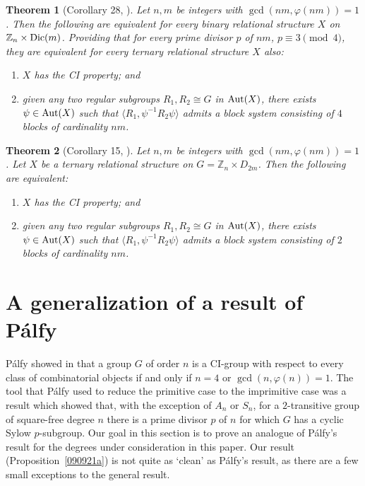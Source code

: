 \documentclass[11pt]{amsart}
\numberwithin{equation}{section}
\newtheorem{thrm}{Theorem}[section]
\theoremstyle{definition}
\newcounter{case}
\def\Aut{{\rm Aut}}
\def\Z{{\mathbb Z}}
\newcommand{\sg}[1]{\langle{#1}\rangle}
\begin{document}
	\begin{thrm}[Corollary 28, \cite{Dobson2003}]\label{dicyclic-conditional}
		Let $n,m$ be integers with $\gcd(nm,\varphi(nm))=1$. Then the following are equivalent for every binary relational structure $X$ on $\Z_n \times {\rm Dic}(m)$. Providing that for every prime divisor $p$ of $nm$, $p \equiv 3 \pmod{4}$, they are equivalent for every ternary relational structure $X$ also: 
		\begin{enumerate}
			\item $X$ has the CI property; and
			\item given any two regular subgroups $R_1, R_2 \cong G$ in $\Aut(X)$, there exists $\psi \in \Aut(X)$ such that $\sg{R_1, \psi^{-1}R_2\psi}$ admits a  block system consisting of $4$ blocks of cardinality $nm$.
		\end{enumerate} 
	\end{thrm}
	
	
	\begin{thrm}[Corollary 15, \cite{Dobson2003}]\label{dihedral-conditional}
		Let $n,m$ be integers with $\gcd(nm,\varphi(nm))=1$. Let $X$ be a ternary relational structure on $G=\Z_n\times D_{2m}$. Then the following are equivalent:
		\begin{enumerate}
			\item $X$ has the CI property; and
			\item given any two regular subgroups $R_1, R_2 \cong G$ in $\Aut(X)$, there exists $\psi \in \Aut(X)$ such that $\sg{R_1, \psi^{-1}R_2\psi}$ admits a block system consisting of $2$ blocks of cardinality $nm$.
		\end{enumerate} 
	\end{thrm}
	
	
	\section{A generalization of a result of P\'alfy}
	
	P\'alfy showed in \cite{Palfy1987} that a group $G$ of order $n$ is a CI-group with respect to every class of combinatorial objects if and only if $n = 4$ or $\gcd(n,\varphi(n)) = 1$.  The tool that P\'alfy used to reduce the primitive case to the imprimitive case was a result which showed that, with the exception of $A_n$ or $S_n$, for a $2$-transitive group of square-free degree $n$ there is a prime divisor $p$ of $n$ for which $G$ has a cyclic Sylow $p$-subgroup.  Our goal in this section is to prove an analogue of P\'alfy's result for the degrees under consideration in this paper.  Our result (Proposition~\ref{090921a}) is not quite as `clean' as P\'alfy's result, as there are a few small exceptions to the general result. 
	
\end{document}
